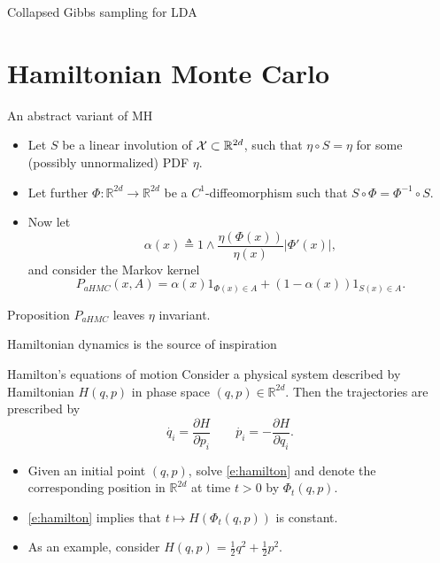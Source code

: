\documentclass[10pt]{beamer}
\def\blank{\vspace{.5\textheight}}
\begin{document}
\begin{frame}{Collapsed Gibbs sampling for LDA}

\end{frame}

\section{Hamiltonian Monte Carlo}

\begin{frame}{An abstract variant of MH}
\begin{itemize}
  \item Let $S$ be a linear involution of $\mathcal{X}\subset\mathbb{R}^{2d}$, such that $\eta\circ S = \eta$ for some (possibly unnormalized) PDF $\eta$.
  \vspace{2.5cm}
  \item Let further $\Phi:\mathbb{R}^{2d}\rightarrow \mathbb{R}^{2d}$ be a $C^1$-diffeomorphism such that $S\circ \Phi = \Phi^{-1}\circ S$.
  \item Now let 
\begin{equation}
    \label{e:acceptance_probability_abstract_HMC}
    \alpha(x) \triangleq 1\wedge \frac{\eta(\Phi(x))}{\eta(x)} \vert\Phi'(x)\vert,
\end{equation}
and consider the Markov kernel
$$
P_{aHMC}(x,A) = \alpha(x) 1_{\Phi(x)\in A} + (1-\alpha(x))1_{S(x)\in A}.
$$
\end{itemize}
\begin{block}{Proposition}
$P_{aHMC}$ leaves $\eta$ invariant.
\end{block}
\end{frame}

\begin{frame}{Hamiltonian dynamics is the source of inspiration}
\begin{block}{Hamilton's equations of motion}
Consider a physical system described by Hamiltonian $H(q,p)$ in phase space $(q,p)\in \mathbb{R}^{2d}$. Then the trajectories are prescribed by
\begin{equation}
  \label{e:hamilton}
  \dot{q_i} = \frac{\partial H}{\partial p_i} \qquad \dot{p_i} = -\frac{\partial H}{\partial q_i}.
\end{equation}
\end{block}
\begin{itemize}
  \item Given an initial point $(q,p)$, solve \eqref{e:hamilton} and denote the corresponding position in $\mathbb{R}^{2d}$ at time $t>0$ by $\Phi_t(q,p)$.
  \item \eqref{e:hamilton} implies that $t\mapsto H(\Phi_t(q,p))$ is constant.
  \item As an example, consider $H(q,p) = \frac12 q^2 + \frac12 p^2.$
\end{itemize}
\blank
\end{frame}
\end{document}
